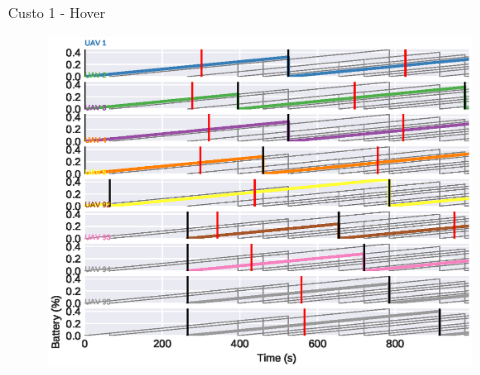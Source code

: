 \begin{frame}{Custo 1 - Hover}
            \begin{figure}[!htb]
                 \includegraphics[width=\textwidth]{custo_1/uav_hover_acum_all.eps}
             \end{figure}
        \end{frame}